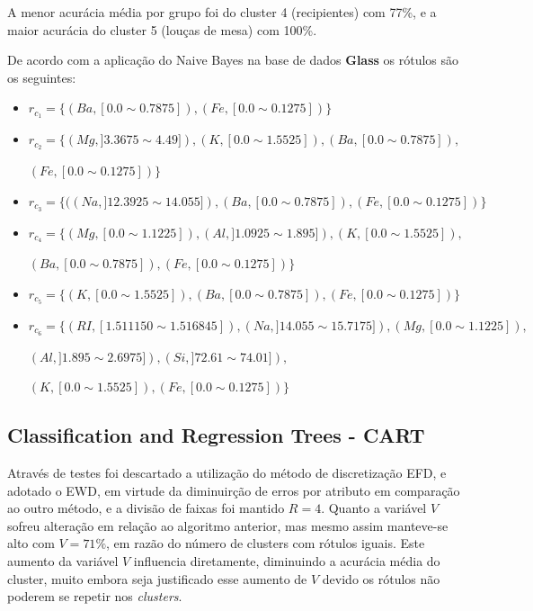 A menor acurácia média por grupo foi do cluster 4 (recipientes) com 77\%, e a maior acurácia do cluster 5 (louças de mesa) com 100\%.

De acordo com a aplicação do Naive Bayes na base de dados \textbf{Glass} os rótulos são os seguintes:
\begin{itemize}[noitemsep]
 \item ${r_{c_1}=\{ (Ba,[ 0.0 \sim 0.7875 ] ),(Fe,[ 0.0 \sim 0.1275 ] ) \} }$  
 \item ${r_{c_2}=\{ (Mg,] 3.3675 \sim  4.49 ] ),(K,[ 0.0 \sim 1.5525 ] ),(Ba,[ 0.0 \sim 0.7875 ] ),}$
 
 ${(Fe,[ 0.0 \sim 0.1275 ] ) \} }$
 \item ${r_{c_3}=\{ ((Na,]12.3925 \sim 14.055 ] ),(Ba,[ 0.0 \sim 0.7875 ] ),(Fe,[ 0.0 \sim 0.1275 ] )  \} }$  
 \item ${r_{c_4}=\{ (Mg,[ 0.0 \sim  1.1225 ] ),(Al,] 1.0925 \sim 1.895 ] ), (K,[ 0.0 \sim 1.5525 ] ),}$

 ${ (Ba,[ 0.0 \sim 0.7875 ] ),(Fe,[ 0.0 \sim 0.1275 ] ) \} }$
 \item ${r_{c_5}=\{  (K,[ 0.0 \sim 1.5525 ]  ),(Ba,[ 0.0 \sim 0.7875 ] ), (Fe,[ 0.0 \sim 0.1275 ] )\} }$
 \item ${r_{c_6}=\{ (RI,[ 1.511150 \sim  1.516845  ] ),(Na,]14.055 \sim 15.7175 ] ),  (Mg,[ 0.0 \sim  1.1225  ] ), }$
 
 ${ (Al,] 1.895 \sim 2.6975 ] ), (Si,] 72.61 \sim 74.01 ] ),  }$
 
 ${ (K,[ 0.0 \sim 1.5525] ),(Fe,[ 0.0 \sim 0.1275 ] ) \} }$
\end{itemize}


\subsection{Classification and Regression Trees - CART} \label{cap:resultados:ssec:glass:cart}


Através de testes foi descartado a utilização do método de discretização EFD, e adotado o EWD, em virtude da diminuirção de erros por atributo em comparação ao outro método, e a divisão de faixas foi mantido ${R=4}$. Quanto a variável ${V}$ sofreu alteração em relação ao algoritmo anterior, mas mesmo assim manteve-se alto com ${V=71\%}$, em razão do número de clusters com rótulos iguais. Este aumento da variável ${V}$ influencia diretamente, diminuindo a acurácia média do cluster, muito embora seja justificado esse aumento de ${V}$ devido os rótulos não poderem se repetir nos \textit{clusters}.

